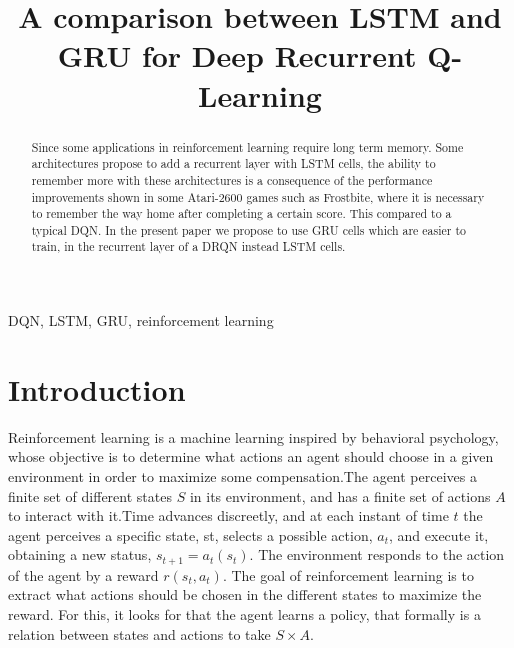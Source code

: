 \documentclass[conference]{IEEEtran}
\begin{document}
\title{A comparison between LSTM and GRU for Deep Recurrent Q-Learning}

\author{
\and
{}
}

\maketitle

\begin{abstract}
Since some applications in reinforcement learning require long term memory. Some architectures propose to add a recurrent layer with LSTM cells, the ability to remember more with these architectures is a consequence of the performance improvements shown in some Atari-2600 games such as Frostbite, where it is necessary to remember the way home after completing a certain score. This compared to a typical DQN. In the present paper we propose to use GRU cells which are easier to train, in the recurrent layer of a DRQN instead LSTM cells.
\end{abstract}


\begin{IEEEkeywords}
DQN, LSTM, GRU, reinforcement learning
\end{IEEEkeywords}

\section{Introduction}

Reinforcement learning is a machine learning inspired by behavioral psychology, whose objective is to determine what actions an agent should choose in a given environment in order to maximize some compensation.The agent perceives a finite set of different states $S$ in its environment, and has a finite set of actions $A$ to interact with it.Time advances discreetly, and at each instant of time $t$ the agent perceives a specific state, st, selects a possible action, $a_t$, and execute it, obtaining a new status, $s_{t+1} = a_t(s_t)$.
The environment responds to the action of the agent by a reward $r(s_t,a_t)$.
The goal of reinforcement learning is to extract what actions should be chosen in the different states to maximize the reward. For this, it looks for that the agent learns a policy, that formally is a relation between states and actions to take $S \times A$.
\end{document}
